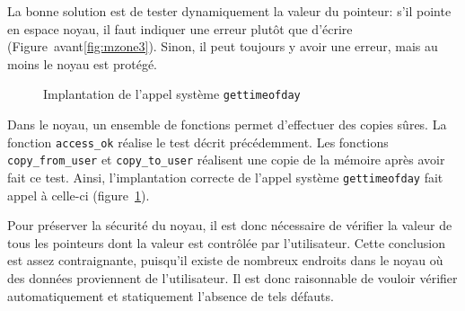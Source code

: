 La bonne solution est de tester dynamiquement la valeur du pointeur: s'il pointe
en espace noyau, il faut indiquer une erreur plutôt que d'écrire
(Figure~avant\ref{fig:mzone3}). Sinon, il peut toujours y avoir une erreur, mais
au moins le noyau est protégé.

\begin{figure}
\caption{Implantation de l'appel système \texttt{gettimeofday}}
\label{fig:implem-gettime}
\end{figure}

Dans le noyau, un ensemble de fonctions permet d'effectuer des copies sûres. La
fonction \texttt{access\_ok} réalise le test décrit précédemment. Les fonctions
\texttt{copy\_from\_user} et \texttt{copy\_to\_user} réalisent une copie de la
mémoire après avoir fait ce test. Ainsi, l'implantation correcte de l'appel
système \texttt{gettimeofday} fait appel à celle-ci
(figure~\ref{fig:implem-gettime}).

Pour préserver la sécurité du noyau, il est donc nécessaire de vérifier la
valeur de tous les pointeurs dont la valeur est contrôlée par l'utilisateur.
Cette conclusion est assez contraignante, puisqu'il existe de nombreux endroits
dans le noyau où des données proviennent de l'utilisateur. Il est donc
raisonnable de vouloir vérifier automatiquement et statiquement l'absence de
tels défauts.







